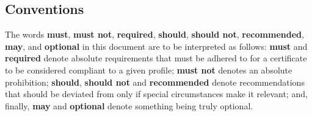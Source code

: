 \subsection{Conventions}

The words \textbf{must}, \textbf{must not}, \textbf{required}, \textbf{should}, \textbf{should not}, \textbf{recommended}, \textbf{may}, and \textbf{optional} in this document are to be interpreted as follows: \textbf{must} and \textbf{required} denote absolute requirements that must be adhered to for a certificate to be considered compliant to a given profile; \textbf{must not} denotes an absolute prohibition; \textbf{should}, \textbf{should not} and \textbf{recommended} denote recommendations that should be deviated from only if special circumstances make it relevant; and, finally, \textbf{may} and \textbf{optional} denote something being truly optional.
